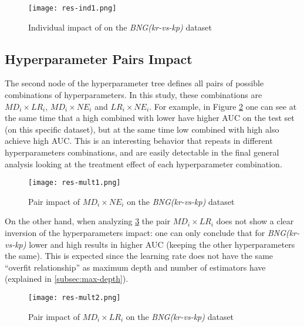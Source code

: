\begin{figure}[!h]
    \centering
    \texttt{[image: res-ind1.png]} 
    \caption{Individual impact of \textbf{} on the \textit{BNG(kr-vs-kp)} dataset}
    \label{fig:res-ind1}
\end{figure}

\subsection{Hyperparameter Pairs Impact}
\label{subsec:double-impact}

The second node of the hyperparameter tree defines all pairs of possible combinations of hyperparameters. In this study, these combinations are $MD_i \times LR_i$, $MD_i \times NE_i$ and $LR_i \times NE_i$. For example, in Figure \ref{fig:res-mult1} one can see at the same time that a high \textbf{} combined with lower \textbf{} have higher AUC on the test set (on this specific dataset), but at the same time low \textbf{} combined with high \textbf{} also achieve high AUC. This is an interesting behavior that repeats in different hyperparameters combinations, and are easily detectable in the final general analysis looking at the treatment effect of each hyperparameter combination.

\begin{figure}[H]
    \centering
    \texttt{[image: res-mult1.png]} 
    \caption{Pair impact of $MD_i \times NE_i$  on the \textit{BNG(kr-vs-kp)} dataset}
    \label{fig:res-mult1}
\end{figure}

On the other hand, when analyzing \ref{fig:res-mult2} the pair $MD_i \times LR_i$ does not show a clear inversion of the hyperparameters impact: one can only conclude that for \textit{BNG(kr-vs-kp)} lower \textbf{} and high \textbf{} results in higher AUC (keeping the other hyperparameters the same). This is expected since the learning rate does not have the same ``overfit relationship'' as maximum depth and number of estimators have (explained in \ref{subsec:max-depth}).

\begin{figure}[H]
    \centering
    \texttt{[image: res-mult2.png]}
    \caption{Pair impact of $MD_i \times LR_i$  on the \textit{BNG(kr-vs-kp)} dataset}
    \label{fig:res-mult2}
\end{figure}

